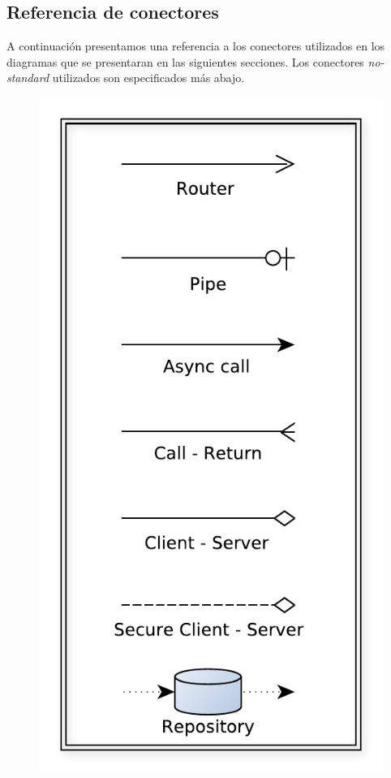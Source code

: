 \newcommand{\nota}[1]{
  $\bullet$ {\color{red}{#1}}
}

\subsection{Referencia de conectores}
A continuación presentamos una referencia a los conectores utilizados en los diagramas que se presentaran en las siguientes secciones. Los conectores \emph{no-standard} utilizados son especificados más abajo.

\begin{multicols}{2}
\begin{figure}[H]
	\centering
	\includegraphics[scale=0.6]{graficos/call_reference.pdf}

\end{figure}
\end{multicols}
